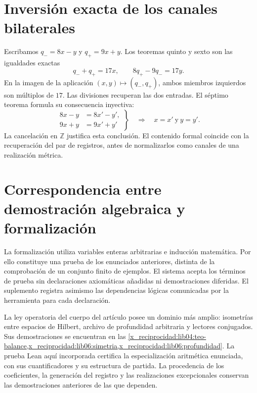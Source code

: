 \section*{Inversión exacta de los canales bilaterales}

Escribamos \(q_-=8x-y\) y \(q_+=9x+y\). Los teoremas quinto y sexto
son las igualdades exactas
\[
 q_-+q_+=17x,\qquad 8q_+-9q_-=17y.
\]
En la imagen de la aplicación \((x,y)\mapsto(q_-,q_+)\), ambos miembros
izquierdos son múltiplos de \(17\). Las divisiones recuperan las dos
entradas. El séptimo teorema formula su consecuencia inyectiva:
\[
 \left.
 \begin{aligned}
 8x-y&=8x'-y',\\
 9x+y&=9x'+y'
 \end{aligned}
 \right\}
 \quad\Longrightarrow\quad x=x'\ \text{y}\ y=y'.
\]
La cancelación en \(\mathbb Z\) justifica esta conclusión. El contenido
formal coincide con la recuperación del par de registros, antes de
normalizarlos como canales de una realización métrica.

\section*{Correspondencia entre demostración algebraica y formalización}

La formalización utiliza variables enteras arbitrarias e inducción
matemática. Por ello constituye una prueba de los enunciados anteriores,
distinta de la comprobación de un conjunto finito de ejemplos. El sistema
acepta los términos de prueba sin declaraciones axiomáticas añadidas ni
demostraciones diferidas. El suplemento registra asimismo las dependencias
lógicas comunicadas por la herramienta para cada declaración.

La ley operatoria del cuerpo del artículo posee un dominio más amplio:
isometrías entre espacios de Hilbert, archivo de profundidad arbitraria y
lectores conjugados. Sus demostraciones se encuentran en las
\cref{x_reciprocidad:lib04:teo-balance,x_reciprocidad:lib06:simetria,x_reciprocidad:lib06:profundidad}. La prueba Lean
aquí incorporada certifica la especialización aritmética enunciada, con
sus cuantificadores y su estructura de partida. La procedencia de los
coeficientes, la generación del registro y las realizaciones excepcionales
conservan las demostraciones anteriores de las que dependen.
